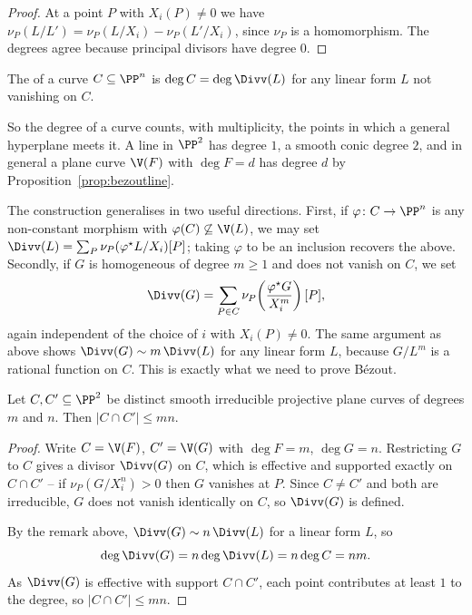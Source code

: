 \begin{proof}
	At a point $P$ with $X_i(P)\neq0$ we have $\nu_P(L/L') = \nu_P(L/X_i) - \nu_P(L'/X_i)$, since $\nu_P$ is a homomorphism. The degrees agree because principal divisors have degree $0$.
\end{proof}

\begin{definition}
	The  of a curve $C \subseteq \PP^n$ is $\deg C = \deg\Divv(L)$ for any linear form $L$ not vanishing on $C$.
\end{definition}

So the degree of a curve counts, with multiplicity, the points in which a general hyperplane meets it. A line in $\PP^2$ has degree $1$, a smooth conic degree $2$, and in general a plane curve $\V(F)$ with $\deg F = d$ has degree $d$ by Proposition~\ref{prop:bezoutline}.

The construction generalises in two useful directions. First, if $\varphi \colon C \to \PP^n$ is any non-constant morphism with $\varphi(C)\not\subseteq \V(L)$, we may set $\Divv(L) = \sum_P \nu_P(\varphi^\star L/X_i)[P]$; taking $\varphi$ to be an inclusion recovers the above. Secondly, if $G$ is homogeneous of degree $m \geq 1$ and does not vanish on $C$, we set
$$\Divv(G) = \sum_{P \in C}\nu_P\!\left(\frac{\varphi^\star G}{X_i^m}\right)[P],$$
again independent of the choice of $i$ with $X_i(P)\neq 0$. The same argument as above shows $\Divv(G) \sim m\,\Divv(L)$ for any linear form $L$, because $G/L^m$ is a rational function on $C$. This is exactly what we need to prove B\'ezout.

\begin{theorem}\label{thm:weakbezout}
	Let $C, C' \subseteq \PP^2$ be distinct smooth irreducible projective plane curves of degrees $m$ and $n$. Then $|C\cap C'| \leq mn$.
\end{theorem}

\begin{proof}
	Write $C = \V(F)$, $C' = \V(G)$ with $\deg F = m$, $\deg G = n$. Restricting $G$ to $C$ gives a divisor $\Divv(G)$ on $C$, which is effective and supported exactly on $C \cap C'$ -- if $\nu_P(G/X_i^n) > 0$ then $G$ vanishes at $P$. Since $C \neq C'$ and both are irreducible, $G$ does not vanish identically on $C$, so $\Divv(G)$ is defined.

	By the remark above, $\Divv(G) \sim n\,\Divv(L)$ for a linear form $L$, so
	$$\deg\Divv(G) = n\deg\Divv(L) = n\deg C = nm.$$
	As $\Divv(G)$ is effective with support $C\cap C'$, each point contributes at least $1$ to the degree, so $|C\cap C'| \leq mn$.
\end{proof}

